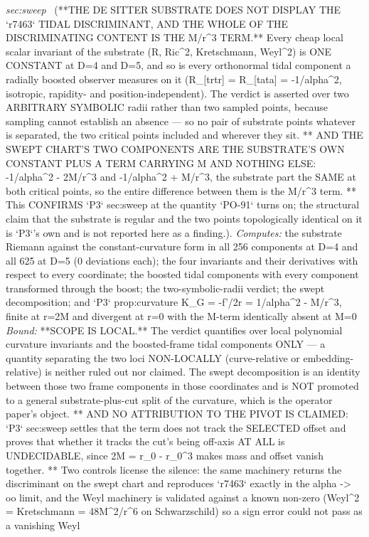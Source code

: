 \begin{description}
\textit{sec:sweep} \ (**THE DE SITTER SUBSTRATE DOES NOT DISPLAY THE `r7463` TIDAL DISCRIMINANT, AND THE WHOLE OF THE DISCRIMINATING CONTENT IS THE M/r\textasciicircum{}3 TERM.** Every cheap local scalar invariant of the substrate (R, Ric\textasciicircum{}2, Kretschmann, Weyl\textasciicircum{}2) is ONE CONSTANT at D=4 and D=5, and so is every orthonormal tidal component a radially boosted observer measures on it (R\_[trtr] = R\_[tata] = -1/alpha\textasciicircum{}2, isotropic, rapidity- and position-independent). The verdict is asserted over two ARBITRARY SYMBOLIC radii rather than two sampled points, because sampling cannot establish an absence --- so no pair of substrate points whatever is separated, the two critical points included and wherever they sit. ** AND THE SWEPT CHART'S TWO COMPONENTS ARE THE SUBSTRATE'S OWN CONSTANT PLUS A TERM CARRYING M AND NOTHING ELSE: -1/alpha\textasciicircum{}2 - 2M/r\textasciicircum{}3 and -1/alpha\textasciicircum{}2 + M/r\textasciicircum{}3, the substrate part the SAME at both critical points, so the entire difference between them is the M/r\textasciicircum{}3 term. ** This CONFIRMS `P3` sec:sweep at the quantity `PO-91` turns on; the structural claim that the substrate is regular and the two points topologically identical on it is `P3`'s own and is not reported here as a finding.). 
\emph{Computes:} the substrate Riemann against the constant-curvature form in all 256 components at D=4 and all 625 at D=5 (0 deviations each); the four invariants and their derivatives with respect to every coordinate; the boosted tidal components with every component transformed through the boost; the two-symbolic-radii verdict; the swept decomposition; and `P3` prop:curvature K\_G = -f'/2r = 1/alpha\textasciicircum{}2 - M/r\textasciicircum{}3, finite at r=2M and divergent at r=0 with the M-term identically absent at M=0
 \emph{Bound:} **SCOPE IS LOCAL.** The verdict quantifies over local polynomial curvature invariants and the boosted-frame tidal components ONLY --- a quantity separating the two loci NON-LOCALLY (curve-relative or embedding-relative) is neither ruled out nor claimed. The swept decomposition is an identity between those two frame components in those coordinates and is NOT promoted to a general substrate-plus-cut split of the curvature, which is the operator paper's object. ** AND NO ATTRIBUTION TO THE PIVOT IS CLAIMED: `P3` sec:sweep settles that the term does not track the SELECTED offset and proves that whether it tracks the cut's being off-axis AT ALL is UNDECIDABLE, since 2M = r\_0 - r\_0\textasciicircum{}3 makes mass and offset vanish together. ** Two controls license the silence: the same machinery returns the discriminant on the swept chart and reproduces `r7463` exactly in the alpha -> oo limit, and the Weyl machinery is validated against a known non-zero (Weyl\textasciicircum{}2 = Kretschmann = 48M\textasciicircum{}2/r\textasciicircum{}6 on Schwarzschild) so a sign error could not pass as a vanishing Weyl

\end{description}
